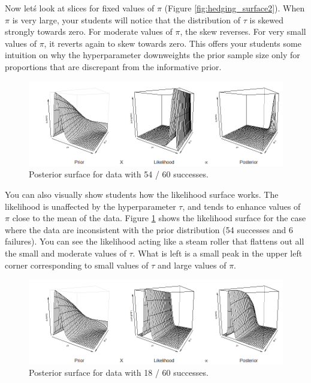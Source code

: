 \documentclass[12pt]{article}
\begin{document}
Now let\'s look at slices for fixed values of $\pi$ (Figure \ref{fig:hedging_surface2}). When $\pi$ is very large, your students will notice that the distribution of $\tau$ is skewed strongly towards zero. For moderate values of $\pi$, the skew reverses. For very small values of $\pi$, it reverts again to skew towards zero. This offers your students some intuition on why the hyperparameter downweights the prior sample size only for proportions that are discrepant from the informative prior.

\begin{figure}
\begin{center}
\includegraphics[width=6.25in]{fig6.png}
\end{center}
\caption{Posterior surface for data with 54 / 60 successes. \label{fig:hedging_surface3}}
\end{figure}

You can also visually show students how the likelihood surface works. The likelihood is unaffected by the hyperparameter $\tau$, and tends to enhance values of $\pi$ close to the mean of the data. Figure \ref{fig:hedging_surface3} shows the likelihood surface for the case where the data are inconsistent with the prior distribution (54 successes and 6 failures). You can see the likelihood acting like a steam roller that flattens out all the small and moderate values of $\tau$. What is left is a small peak in the upper left corner corresponding to small values of $\tau$ and large values of $\pi$.

\begin{figure}
\begin{center}
\includegraphics[width=6.25in]{fig7.png}
\end{center}
\caption{Posterior surface for data with 18 / 60 successes. \label{fig:hedging_surface4}}
\end{figure}
\end{document}
